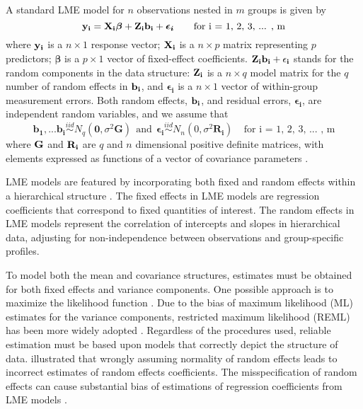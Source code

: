 \documentclass[12pt]{article}
\begin{document}
A standard LME model for \(n\) observations nested in \(m\) groups is
given by \begin{equation}
\bf{y_i} = \bf{X_i} \boldsymbol{\beta} + \bf{Z_ib_i} + \boldsymbol{\epsilon_i} \ \ \ \ \ \  \text{for  i = 1, 2, 3, ... , m} 
\end{equation} where \(\bf{y_i}\) is a \(n \times 1\) response vector;
\(\bf{X_i}\) is a \(n \times p\) matrix representing \(p\) predictors;
\(\boldsymbol{\beta}\) is a \(p\times 1\) vector of fixed-effect
coefficients. \(\bf{Z_ib_i + \epsilon_i}\) stands for the random
components in the data structure: \(\bf{Z_i}\) is a \(n \times q\) model
matrix for the \(q\) number of random effects in \(\bf{b_i}\), and
\(\boldsymbol{\epsilon_i}\) is a \(n \times 1\) vector of within-group
measurement errors. Both random effects, \(\bf{b_i}\), and residual
errors, \(\boldsymbol{\epsilon_i}\), are independent random variables,
and we assume that
\begin{equation} \boldsymbol{b_1, ... b_i} \overset{iid} \sim N_q(\boldsymbol{0}, \sigma^2 \boldsymbol{G}) \ \ \text{and} \ \ \boldsymbol{\epsilon_i} \overset{iid}\sim N_n(0,\sigma^2 \boldsymbol{R_i})  \ \ \ \ \ \text{for  i = 1, 2, 3, ... , m} \end{equation}
where \(\bf{G}\) and \(\bf{R_i}\) are \(q\) and \(n\) dimensional
positive definite matrices, with elements expressed as functions of a
vector of covariance parameters \citep{laird1982random}.

LME models are featured by incorporating both fixed and random effects
within a hierarchical structure \citep{bates1998computational}. The
fixed effects in LME models are regression coefficients that correspond
to fixed quantities of interest. The random effects in LME models
represent the correlation of intercepts and slopes in hierarchical data,
adjusting for non-independence between observations and group-specific
profiles.

To model both the mean and covariance structures, estimates must be
obtained for both fixed effects and variance components. One possible
approach is to maximize the likelihood function
\citep{mcculloch1997maximum}. Due to the bias of maximum likelihood (ML)
estimates for the variance components, restricted maximum likelihood
(REML) has been more widely adopted \citep{gilmour1995average}.
Regardless of the procedures used, reliable estimation must be based
upon models that correctly depict the structure of data.
\citet{verbeke1996linear} illustrated that wrongly assuming normality of
random effects leads to incorrect estimates of random effects
coefficients. The misspecification of random effects can cause
substantial bias of estimations of regression coefficients from LME
models \citep{heagerty2001misspecified, Hui2021}.
\end{document}
